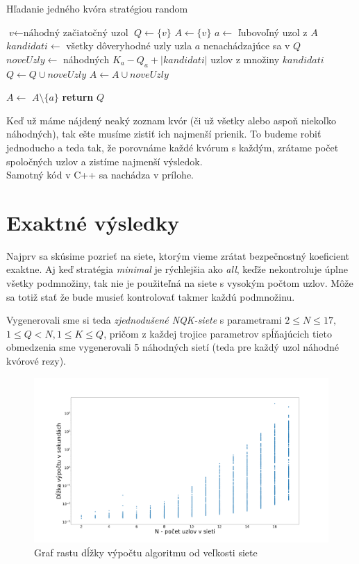 \begin{algorithm}
\caption{Hľadanie jedného kvóra stratégiou random}\label{alg:randomstrategy}
\begin{algorithmic}[1]
\State $\textit{v} \gets \text{náhodný začiatočný uzol}$
\State $Q \gets \{v\}$
\State $A \gets \{v\}$
  \State $a \gets$ ľubovoľný uzol z $A$
  \State $kandidati \gets$ všetky dôveryhodné uzly uzla $a$ nenachádzajúce sa v $Q$
    \State $noveUzly \gets$ náhodných $K_a - Q_a + |kandidati|$ uzlov z množiny $kandidati$
    \State $Q \gets Q \cup noveUzly$
    \State $A \gets A \cup noveUzly$
  \EndIf

  \State $A \gets$ $A \setminus\{a\}$
\EndWhile
\State \textbf{return} $Q$
\end{algorithmic}
\end{algorithm}

Keď už máme nájdený neaký zoznam kvór (či už všetky alebo aspoň niekoľko náhodných),
tak ešte musíme zistiť ich najmenší prienik. To budeme robiť jednoducho a teda tak,
že porovnáme každé kvórum s každým, zrátame počet spoločných uzlov a zistíme
najmenší výsledok.\\
Samotný kód v C++ sa nachádza v prílohe.

\section {Exaktné výsledky}

Najprv sa skúsime pozrieť na siete, ktorým vieme zrátat bezpečnostný koeficient
exaktne. 
Aj keď stratégia \textit{minimal} je rýchlejšia ako \textit{all}, keďže nekontroluje
úplne všetky podmnožiny, tak nie je použiteľná na siete s vysokým počtom uzlov.
Môže sa totiž stať že bude musieť kontrolovať takmer každú podmnožinu.

Vygenerovali sme si teda \textit{zjednodušené NQK-siete} s parametrami
$2\leq N\leq 17,$\\
$1\leq Q < N, 1\leq K\leq Q$, pričom z každej trojice parametrov
spĺňajúcich tieto obmedzenia sme vygenerovali 5 náhodných sietí (teda pre každý
uzol náhodné kvórové rezy).

\begin{figure}
\centerline{\includegraphics[width=1.2\textwidth]{images/cas_ku_N.png}}
\caption{Graf rastu dĺžky výpočtu algoritmu od veľkosti siete} \label{obr:cas_velkost}
\end{figure}

